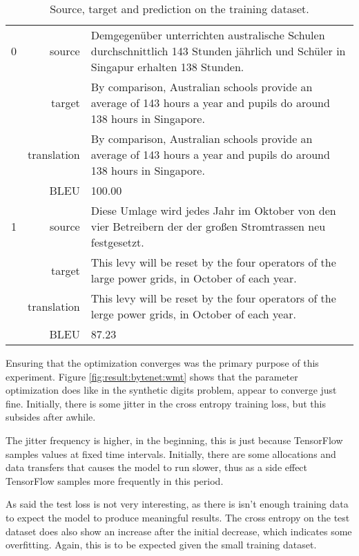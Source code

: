 \begin{table}[h]
\centering
\begin{tabular}{l|r|p{10cm}}
  0 & source & Demgegenüber unterrichten australische Schulen durchschnittlich 143 Stunden jährlich und Schüler in Singapur erhalten 138 Stunden. \\[0.1cm]
    & target & By comparison, Australian schools provide an average of 143 hours a year and pupils do around 138 hours in Singapore. \\[0.1cm]
    & translation & By comparison, Australian schools provide an average of 143 hours a year and pupils do around 138 hours in Singapore. \\[0.1cm]
    & BLEU & 100.00 \\[0.1cm] \hline
  1 & source & Diese Umlage wird jedes Jahr im Oktober von den vier Betreibern der der großen Stromtrassen neu festgesetzt. \\[0.1cm]
    & target & This levy will be reset by the four operators of the large power grids, in October of each year. \\[0.1cm]
    & translation & This levy will be reset by the four operators of the lerge power grids, in October of each year. \\[0.1cm]
    & BLEU & 87.23
\end{tabular}
\caption{Source, target and prediction on the training dataset.}
\label{table:result:bytenet:wmt-train}
\end{table}

Ensuring that the optimization converges was the primary purpose of this experiment. Figure \ref{fig:result:bytenet:wmt} shows that the parameter optimization does like in the synthetic digits problem, appear to converge just fine. Initially, there is some jitter in the cross entropy training loss, but this subsides after awhile.

The jitter frequency is higher, in the beginning, this is just because TensorFlow samples values at fixed time intervals. Initially, there are some allocations and data transfers that causes the model to run slower, thus as a side effect TensorFlow samples more frequently in this period. 

As said the test loss is not very interesting, as there is isn't enough training data to expect the model to produce meaningful results. The cross entropy on the test dataset does also show an increase after the initial decrease, which indicates some overfitting. Again, this is to be expected given the small training dataset.

